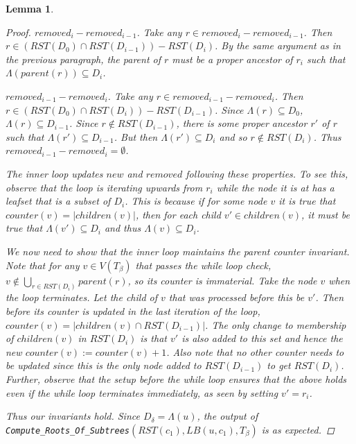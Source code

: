 \documentclass{article}
\newcommand{\leafset}{\Lambda}
\newtheorem{computerootsofsubtreescorrectness}[incompatibility]{Lemma}
\begin{document}
\begin{computerootsofsubtreescorrectness}
\begin{proof}
            \textit{$removed_i - removed_{i-1}$.} Take any $r \in removed_i - removed_{i-1}$. Then $r \in (RST(D_0) \cap RST(D_{i-1})) - RST(D_i)$. By the same argument as in the previous paragraph, the parent of $r$ must be a proper ancestor of $r_i$ such that $\leafset(parent(r)) \subseteq D_i$.

            \textit{$removed_{i-1} - removed_i$.} Take any $r \in removed_{i-1} - removed_i$. Then $r \in (RST(D_0) \cap RST(D_i)) - RST(D_{i-1})$. Since $\leafset(r) \subseteq D_0$, $\leafset(r) \subseteq D_{i-1}$. Since $r \not\in RST(D_{i-1})$, there is some proper ancestor $r'$ of $r$ such that $\leafset(r') \subseteq D_{i-1}$. But then $\leafset(r') \subseteq D_i$ and so $r \not\in RST(D_i)$. Thus $removed_{i-1} - removed_i = \emptyset$.

            The inner loop updates $new$ and $removed$ following these properties. To see this, observe that the loop is iterating upwards from $r_i$ while the node it is at has a leafset that is a subset of $D_i$. This is because if for some node $v$ it is true that $counter(v) = |children(v)|$, then for each child $v' \in children(v)$, it must be true that $\leafset(v') \subseteq D_i$ and thus $\leafset(v) \subseteq D_i$.

            We now need to show that the inner loop maintains the parent counter invariant. Note that for any $v \in V(T_\beta)$ that passes the while loop check, $v \not\in \bigcup_{r \in RST(D_i)} parent(r)$, so its counter is immaterial. Take the node $v$ when the loop terminates. Let the child of $v$ that was processed before this be $v'$. Then before its counter is updated in the last iteration of the loop, $counter(v) = |children(v) \cap RST(D_{i-1})|$. The only change to membership of $children(v)$ in $RST(D_i)$ is that $v'$ is also added to this set and hence the new $counter(v) := counter(v) + 1$. Also note that no other counter needs to be updated since this is the only node added to $RST(D_{i-1})$ to get $RST(D_i)$. Further, observe that the setup before the while loop ensures that the above holds even if the while loop terminates immediately, as seen by setting $v' = r_i$.

            Thus our invariants hold. Since $D_{\delta} = \leafset(u)$, the output of\\ %
            \texttt{Compute\_Roots\_Of\_Subtrees}$(RST(c_1), LB(u, c_1), T_\beta)$ is as expected.
        \end{proof}
    \end{computerootsofsubtreescorrectness}
\end{document}
